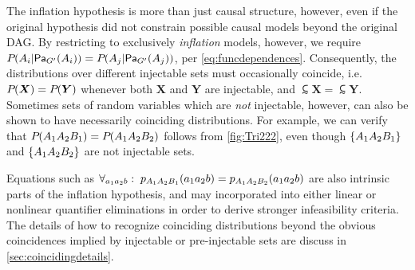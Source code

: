 
The inflation hypothesis is more than just causal structure, however, even if the original hypothesis did not constrain possible causal models beyond the original DAG.  By restricting to exclusively \emph{inflation} models, however, we require $\pdf{A_i| \Pa[G']{A_i}}=\pdf{A_j|\Pa[G']{A_j}}$, per \cref{eq:funcdependences}. Consequently, the distributions over different injectable sets must occasionally coincide, i.e. $\pdf{\bm{X}}=\pdf{\bm{Y}}$ whenever both $\bm{X}$ and $\bm{Y}$ are injectable, and $\subsim{\bm{X}}=\subsim{\bm{Y}}$. Sometimes sets of random variables which are \emph{not} injectable, however, can also be shown to have necessarily coinciding distributions. For example, we can verify that $\pdf{A_1 A_2 B_1}=\pdf{A_1 A_2 B_2}$ follows from \cref{fig:Tri222}, even though $\brackets{A_1 A_2 B_1}$ and $\brackets{A_1 A_2 B_2}$ are not injectable sets.

Equations such as $\forall_{a_1 a_2 b}:\;\p[A_1 A_2 B_1]{a_1 a_2 b} = \p[A_1 A_2 B_2]{a_1 a_2 b}$ are also intrinsic parts of the inflation hypothesis, and may incorporated into either linear or nonlinear quantifier eliminations in order to derive stronger infeasibility criteria. The details of how to recognize coinciding distributions beyond the obvious coincidences implied by injectable or pre-injectable sets are discuss in \cref{sec:coincidingdetails}.





